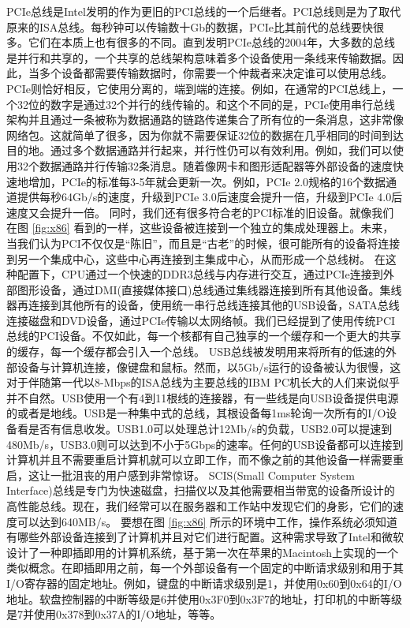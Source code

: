 	PCIe总线是Intel发明的作为更旧的PCI总线的一个后继者。PCI总线则是为了取代原来的ISA总线。每秒钟可以传输数十Gb的数据，PCIe比其前代的总线要快很多。它们在本质上也有很多的不同。直到发明PCIe总线的2004年，大多数的总线是并行和共享的，一个共享的总线架构意味着多个设备使用一条线来传输数据。因此，当多个设备都需要传输数据时，你需要一个仲裁者来决定谁可以使用总线。PCIe则恰好相反，它使用分离的，端到端的连接。例如，在通常的PCI总线上，一个32位的数字是通过32个并行的线传输的。和这个不同的是，PCIe使用串行总线架构并且通过一条被称为数据通路的链路传递集合了所有位的一条消息，这非常像网络包。这就简单了很多，因为你就不需要保证32位的数据在几乎相同的时间到达目的地。通过多个数据通路并行起来，并行性仍可以有效利用。例如，我们可以使用32个数据通路并行传输32条消息。随着像网卡和图形适配器等外部设备的速度快速地增加，PCIe的标准每3-5年就会更新一次。例如，PCIe 2.0规格的16个数据通道提供每秒64Gb/s的速度，升级到PCIe 3.0后速度会提升一倍，升级到PCIe 4.0后速度又会提升一倍。
	同时，我们还有很多符合老的PCI标准的旧设备。就像我们在图 \ref{fig:x86} 看到的一样，这些设备被连接到一个独立的集成处理器上。未来，当我们认为PCI不仅仅是“陈旧”，而且是“古老”的时候，很可能所有的设备将连接到另一个集成中心，这些中心再连接到主集成中心，从而形成一个总线树。
	在这种配置下，CPU通过一个快速的DDR3总线与内存进行交互，通过PCIe连接到外部图形设备，通过DMI(直接媒体接口)总线通过集线器连接到所有其他设备。集线器再连接到其他所有的设备，使用统一串行总线连接其他的USB设备，SATA总线连接磁盘和DVD设备，通过PCIe传输以太网络帧。我们已经提到了使用传统PCI总线的PCI设备。不仅如此，每一个核都有自己独享的一个缓存和一个更大的共享的缓存，每一个缓存都会引入一个总线。
	USB总线被发明用来将所有的低速的外部设备与计算机连接，像键盘和鼠标。然而，以5Gb/s运行的设备被认为很慢，这对于伴随第一代以8-Mbps的ISA总线为主要总线的IBM PC机长大的人们来说似乎并不自然。USB使用一个有4到11根线的连接器，有一些线是向USB设备提供电源的或者是地线。USB是一种集中式的总线，其根设备每1ms轮询一次所有的I/O设备看是否有信息收发。USB1.0可以处理总计12Mb/s的负载，USB2.0可以提速到480Mb/s，USB3.0则可以达到不小于5Gbps的速率。任何的USB设备都可以连接到计算机并且不需要重启计算机就可以立即工作，而不像之前的其他设备一样需要重启，这让一批沮丧的用户感到非常惊讶。
	SCIS(Small Computer System Interface)总线是专门为快速磁盘，扫描仪以及其他需要相当带宽的设备所设计的高性能总线。现在，我们经常可以在服务器和工作站中发现它们的身影，它们的速度可以达到640MB/s。
	要想在图 \ref{fig:x86} 所示的环境中工作，操作系统必须知道有哪些外部设备连接到了计算机并且对它们进行配置。这种需求导致了Intel和微软设计了一种即插即用的计算机系统，基于第一次在苹果的Macintosh上实现的一个类似概念。在即插即用之前，每一个外部设备有一个固定的中断请求级别和用于其I/O寄存器的固定地址。例如，键盘的中断请求级别是1，并使用0x60到0x64的I/O地址。软盘控制器的中断等级是6并使用0x3F0到0x3F7的地址，打印机的中断等级是7并使用0x378到0x37A的I/O地址，等等。
